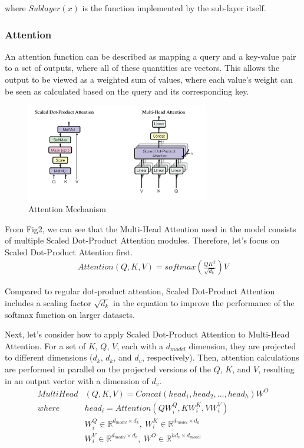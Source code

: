\documentclass[conference]{IEEEtran}
\begin{document}
where $Sublayer(x)$ is the function implemented by the sub-layer itself.


\subsubsection{Attention}
\par An attention function can be described as mapping a query and a key-value pair 
to a set of outputs, where all of these quantities are vectors. This allows the output 
to be viewed as a weighted sum of values, where each value's weight can be seen as 
calculated based on the query and its corresponding key.

\begin{figure}[htbp]
    \centerline{\includegraphics[width = 8cm]{pic/fig2.png}}
    \caption{Attention Mechanism}
    \label{fig}
\end{figure}

\par From Fig2, we can see that the Multi-Head Attention used in the model consists of 
multiple Scaled Dot-Product Attention modules. Therefore, let's focus on 
Scaled Dot-Product Attention first.
\begin{align*}
    Attention(Q, K, V) = softmax(\frac{QK^T}{\sqrt{d_k}})V
\end{align*}

\par Compared to regular dot-product attention, Scaled Dot-Product Attention includes a 
scaling factor $\sqrt{d_k}$\cite{britz2017massive} in the equation to improve the performance of the softmax 
function on larger datasets.

\par Next, let's consider how to apply Scaled Dot-Product Attention to Multi-Head Attention. 
For a set of $K$, $Q$, $V$, each with a $d_{model}$ dimension, they are projected to different 
dimensions ($d_k$, $d_k$, and $d_v$, respectively). Then, attention calculations are 
performed in parallel on the projected versions of the $Q$, $K$, and $V$, 
resulting in an output vector with a dimension of $d_v$.
\begin{align*}
    MultiHead&(Q, K, V) = Concat(head_1, head_2, ... , head_h)W^O \\
    where \  &head_i = Attention(QW^Q_i, KW^K_i, VW^V_i)\\
    &W^Q_i \in \mathbb{R}^{d_{model}\times d_k}, \  
    W^K_i \in \mathbb{R}^{d_{model}\times d_k}\\
    &W^V_i \in \mathbb{R}^{d_{model}\times d_v}, \ 
    W^O \in \mathbb{R}^{hd_v \times d_{model}}
\end{align*}
\end{document}
